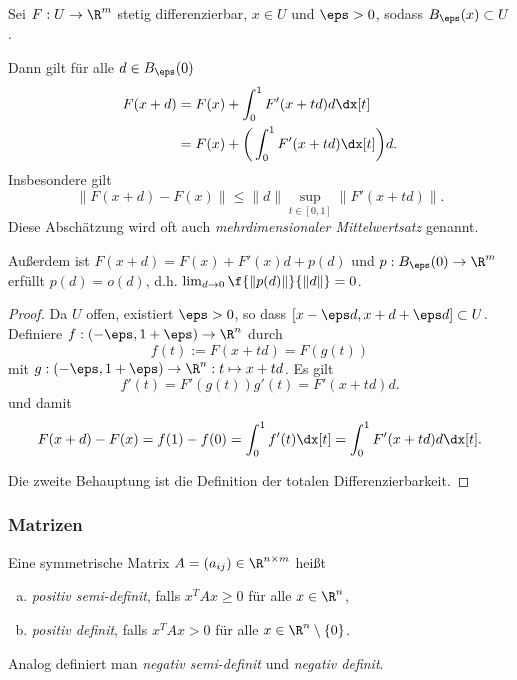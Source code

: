 \begin{lem} \label{2.4}
	Sei $F: U \to \R^m$ stetig differenzierbar, $x\in U$ und $\eps > 0$, sodass $B_\eps(x) \subset U$.

	Dann gilt für alle $d \in B_\eps(0)$
	\begin{align*}
		F(x+d)
		&= F(x) + \int_0^1 F'(x+td) d \dx[t] \\
		&= F(x) + \bigg( \int_0^1 F'(x+td) \dx[t] \bigg) d.
	\end{align*}
	Insbesondere gilt
	\[
		\| F(x+d) - F(x) \|
		\le \|d\| \sup_{t\in [0,1]} \|F'(x+td)\|.
	\]
	Diese Abschätzung wird oft auch \emph{mehrdimensionaler Mittelwertsatz} genannt.

	Außerdem ist $F(x+d) = F(x) + F'(x)d + p(d)$ und $p: B_\eps(0) \to \R^m$ erfüllt $p(d) = o(d)$, d.h.
	$\lim_{d\to 0} \f {\|p(d)\|}{\|d\|} = 0$.

	\begin{proof}
		Da $U$ offen, existiert $\eps > 0$, so dass $[x- \eps d, x + d + \eps d] \subset U$.
		Definiere $f: (-\eps, 1 + \eps) \to \R^n$ durch
		\[
			f(t) := F(x + td) = F(g(t))
		\]
		mit $g:(-\eps, 1 + \eps) \to \R^n : t \mapsto x + td$.
		Es gilt
		\[
			f'(t)
			= F'(g(t)) g'(t)
			= F'(x + td) d.
		\]
		und damit
		\[
			F(x+d) - F(x)
			= f(1) - f(0)
			= \int_0^1 f'(t) \dx[t]
			= \int_0^1 F'(x + td) d \dx[t].
		\]

		Die zweite Behauptung ist die Definition der totalen Differenzierbarkeit.
	\end{proof}
\end{lem}

\subsubsection{Matrizen}

\begin{df} \label{2.5}
	Eine symmetrische Matrix $A = (a_{ij}) \in \R^{n\times m}$ heißt
	\begin{enumerate}[(a)]
		\item
			\emph{positiv semi-definit}, falls $x^TAx \ge 0$ für alle $x \in \R^n$,
		\item
			\emph{positiv definit}, falls $x^TAx > 0$ für alle $x \in \R^n \setminus \{0\}$.
	\end{enumerate}
	Analog definiert man \emph{negativ semi-definit} und \emph{negativ definit}.
\end{df}

